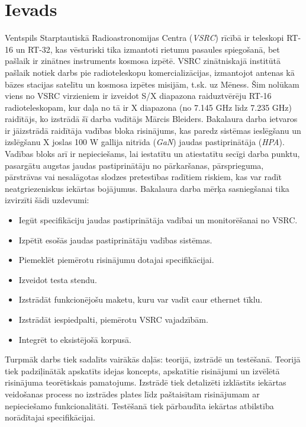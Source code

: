 \chapter*{Ievads}
Ventspils Starptautiskā Radioastronomijas Centra (\textit{VSRC}) rīcībā ir teleskopi RT-16 un RT-32, kas vēsturiski tika izmantoti rietumu pasaules spiegošanā, bet pašlaik ir zinātnes instruments kosmosa izpētē. VSRC zinātniskajā institūtā pašlaik notiek darbs pie radioteleskopu komercializācijas, izmantojot antenas kā bāzes stacijas satelītu un kosmosa izpētes misijām, t.sk. uz Mēness. Šim nolūkam viens no VSRC virzieniem ir izveidot S/X diapazona raiduztvērēju RT-16 radioteleskopam, kur daļa no tā ir X diapazona (no 7.145 GHz līdz 7.235 GHz) raidītājs, ko izstrādā šī darba vadītājs Mārcis Bleiders. Bakalaura darba ietvaros ir jāizstrādā raidītāja vadības bloka risinājums, kas paredz sistēmas ieslēgšanu un izslēgšanu X joslas 100 W gallija nitrīda (\textit{GaN}) jaudas pastiprinātāja (\textit{HPA}). Vadības bloks arī ir nepieciešams, lai iestatītu un atiestatītu secīgi darba punktu, pasargātu augstas jaudas pastiprinātāju no pārkaršanas, pārsprieguma, pārstrāvas vai nesalāgotas slodzes pretestības radītiem riskiem, kas var radīt neatgriezeniskus iekārtas bojājumus. 
Bakalaura darba mērķa sasniegšanai tika izvirzīti šādi uzdevumi:
\begin{itemize}
    \item Iegūt specifikāciju jaudas pastiprinātāja vadībai un monitorēšanai no VSRC.
    \item Izpētīt esošās jaudas pastiprinātāju vadības sistēmas.
    \item Piemeklēt piemērotu risinājumu dotajai specifikācijai.
    \item Izveidot testa stendu.
    \item Izstrādāt funkcionējošu maketu, kuru var vadīt caur ethernet tīklu.
    \item Izstrādāt iespiedpalti, piemērotu VSRC vajadzībām.
    \item Integrēt to eksistējošā korpusā.
\end{itemize}
Turpmāk darbs tiek sadalīts vairākās daļās: teorijā, izstrādē un testēšanā. Teorijā tiek padziļinātāk apskatīts idejas koncepts, apskatītie risinājumi un izvēlētā risinājuma teorētiskais pamatojums. Izstrādē tiek detalizēti izklāstīts iekārtas veidošanas process no izstrādes plates līdz paštaisītam risinājumam ar nepieciešamo funkcionalitāti. Testēšanā tiek pārbaudīta iekārtas atbilstība norādītajai specifikācijai.


